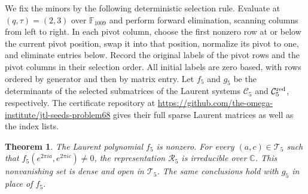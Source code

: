 \documentclass[11pt,a4paper]{article}
\newtheorem{theorem}{Theorem}
\newcommand{\C}{\mathbb C}
\newcommand{\F}{\mathbb F}
\newcommand{\Rcal}{\mathcal R}
\newcommand{\Tcal}{\mathcal T}
\begin{document}
We fix the minors by the following deterministic selection rule.
Evaluate at $(q,\tau)=(2,3)$ over $\F_{1009}$ and perform forward
elimination, scanning columns from left to right. In each pivot column,
choose the first nonzero row at or below the current pivot position,
swap it into that position, normalize its pivot to one, and eliminate
entries below. Record the original labels of the pivot rows and the
pivot columns in their selection order. All initial labels are zero
based, with rows ordered by generator and then by matrix entry.
Let $f_5$ and $g_5$ be the determinants of the selected submatrices of
the Laurent systems $\mathcal C_5$ and $\mathcal C^{\rm red}_5$,
respectively. The certificate repository at
\url{https://github.com/the-omega-institute/jtl-seeds-problem68} gives
their full sparse Laurent matrices as well as the index lists.

\begin{theorem}\label{thm:generic}
The Laurent polynomial $f_5$ is nonzero. For every
$(a,c)\in\Tcal_5$ such that
$f_5(e^{2\pi ia},e^{2\pi ic})\ne0$, the representation $\Rcal_5$
is irreducible over $\C$. This nonvanishing set is dense and open in
$\Tcal_5$. The same conclusions hold with $g_5$ in place of $f_5$.
\end{theorem}
\end{document}
